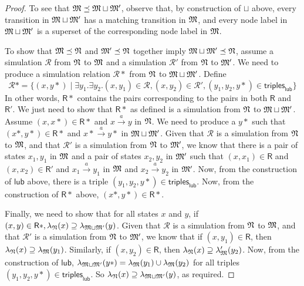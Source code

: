 \begin{proof}
To see that $\frak{M} \preceq \frak{M} \sqcup \frak{M}'$, observe that, by construction of $\sqcup$ above, every transition in $\frak{M} \sqcup \frak{M}'$ has a matching transition in $\frak{M}$, and every node label in  $\frak{M} \sqcup \frak{M}'$ is a superset of the corresponding node label in $\frak{M}$.

To show that $\frak{M} \preceq \frak{N} $ and $\frak{M}' \preceq \frak{N} $ together imply $\frak{M} \sqcup \frak{M}' \preceq \frak{N}$, assume a simulation $\mathcal{R}$ from $\frak{N}$ to $\frak{M}$ and a simulation $\mathcal{R}'$ from $\frak{N}$ to $\frak{M}'$.
We need to produce a simulation relation $\mathcal{R}*$ from $\frak{N}$ to $\frak{M} \sqcup \frak{M}' $.
Define
\[
\mathcal{R}* =   \{(x, y*) \; | \; \exists y_1 . \exists y_2 . (x,y_1) \in \mathcal{R}, (x,y_2) \in \mathcal{R}', (y_1,y_2,y*) \in \mathsf{triples}_\mathsf{lub} \}
\]
In other words, $\mathsf{R}*$ contains the pairs corresponding to the pairs in both $\mathsf{R}$ and $\mathsf{R}'$.
We just need to show that $\mathsf{R}*$ as defined is a simulation from $\frak{N}$ to $\frak{M} \sqcup \frak{M}' $.
Assume $(x,x*) \in \mathsf{R}*$ and $x \xrightarrow{a} y$ in $\frak{N}$. 
We need to produce a $y*$ such that $(x*,y*) \in \mathsf{R}*$ and $x* \xrightarrow{a} y*$ in $\frak{M} \sqcup \frak{M}' $.
Given that $\mathcal{R}$ is a simulation from $\frak{N}$ to $\frak{M}$, and that  $\mathcal{R}'$ is a simulation from $\frak{N}$ to $\frak{M}'$, we know that there is a pair of states $x_1, y_1$ in $\frak{M}$ and a pair of states $x_2, y_2$ in $\frak{M}'$ such that $(x,x_1) \in \mathsf{R}$ and $(x,x_2) \in \mathsf{R}'$ and $x_1 \xrightarrow{a} y_1$ in $\frak{M}$ and $x_2 \xrightarrow{a} y_2$ in $\frak{M}'$.
Now, from the construction of $\mathsf{lub}$ above, there is a triple $(y_1, y_2, y*) \in \mathsf{triples}_\mathsf{lub}$.
Now, from the construction of $\mathsf{R}*$ above, $(x*,y*) \in \mathsf{R}*$.

Finally, we need to show that for all states $x$ and $y$, if $(x,y) \in \mathsf{R}*, \lambda_{\frak{N}}(x) \supseteq \lambda_{\frak{M} \sqcup \frak{M}'}(y)$.
Given that $\mathcal{R}$ is a simulation from $\frak{N}$ to $\frak{M}$, and that  $\mathcal{R}'$ is a simulation from $\frak{N}$ to $\frak{M}'$, we know that if $(x,y_1) \in \mathsf{R}$, then $\lambda_\frak{N}(x) \supseteq \lambda_\frak{M}(y_1)$.
Similarly, if  $(x,y_2) \in \mathsf{R}$, then $\lambda_\frak{N}(x) \supseteq \lambda_\frak{M}'(y_2)$.
Now, from the construction of $\mathsf{lub}$, $\lambda_{\frak{M} \sqcup \frak{M}'}(y*) = \lambda_{\frak{M}}(y_1) \cup \lambda_{\frak{M}}(y_2)$ for all triples $(y_1, y_2, y*) \in \mathsf{triples}_\mathsf{lub}$. 
So $\lambda_{\frak{N}}(x) \supseteq \lambda_{\frak{M} \sqcup \frak{M}'}(y)$, as required.
\end{proof}

